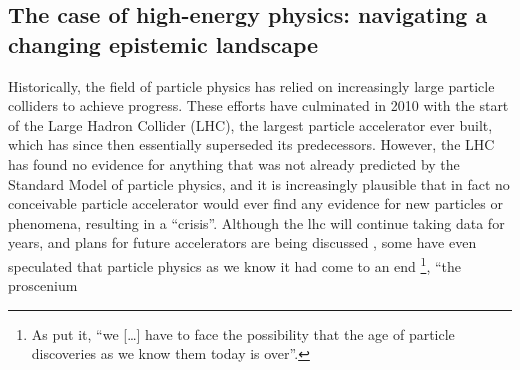 \documentclass{article}
\begin{document}



\subsection{\label{sec:hep}The case of high-energy physics: navigating a changing epistemic landscape}

Historically, the field of particle physics has relied on increasingly large particle colliders to achieve progress. These efforts have culminated in 2010 with the start of the Large Hadron Collider (LHC), the largest particle accelerator ever built, which has since then essentially superseded its predecessors. However, the LHC has found no evidence for anything that was not already predicted by the Standard Model of particle physics, and it is increasingly plausible that in fact no conceivable particle accelerator would ever find any evidence for new particles or phenomena, resulting in a ``crisis''\citep{susy_crisis}. Although the \gls{lhc} will continue taking data for years, and plans for future accelerators are being discussed \citep{Roser2023}, some have even speculated that particle physics as we know it had come to an end \citep{Harlander2023,Kosyakov2023}\footnote{As \citet{Harlander2023} put it, ``we [\dots] have to face the possibility that the age of particle discoveries as we know them today is over''.}, ``the proscenium
\end{document}
